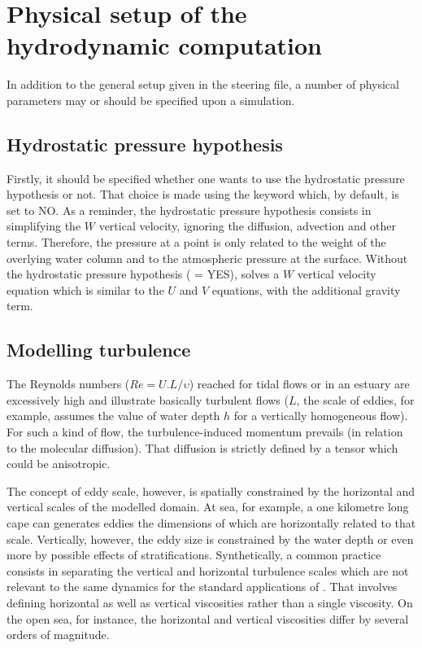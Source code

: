 \chapter{Physical setup of the hydrodynamic computation}

In addition to the general setup given in the steering file, a number of
physical parameters may or should be specified upon a simulation.


\section{Hydrostatic pressure hypothesis}

Firstly, it should be specified whether one wants to use the hydrostatic
pressure hypothesis or not. That choice is made using the keyword
 which, by default, is set to NO. As a
reminder, the hydrostatic pressure hypothesis consists in simplifying the
$W$ vertical velocity, ignoring the diffusion, advection and other
terms. Therefore, the pressure at a point is only related to the weight of the
overlying water column and to the atmospheric pressure at the surface. Without
the hydrostatic pressure hypothesis ( = YES),
 solves a $W$ vertical velocity equation which is similar to
the $U$ and $V$ equations, with the additional gravity term.


\section{Modelling turbulence}

The Reynolds numbers ($Re = U.L/\upsilon$) reached for tidal
flows or in an estuary are excessively high and illustrate basically turbulent
flows ($L$, the scale of eddies, for example, assumes the value of water
depth $h$ for a vertically homogeneous flow). For such a kind of flow,
the turbulence-induced momentum prevails (in relation to the molecular
diffusion). That diffusion is strictly defined by a tensor which could be
anisotropic.

The concept of eddy scale, however, is spatially constrained by the horizontal
and vertical scales of the modelled domain. At sea, for example, a one
kilometre long cape can generates eddies the dimensions of which are
horizontally related to that scale. Vertically, however, the eddy size is
constrained by the water depth or even more by possible effects of
stratifications. Synthetically, a common practice consists in separating the
vertical and horizontal turbulence scales which are not relevant to the same
dynamics for the standard applications of . That involves defining
horizontal as well as vertical viscosities rather than a single viscosity. On
the open sea, for instance, the horizontal and vertical viscosities differ by
several orders of magnitude.

